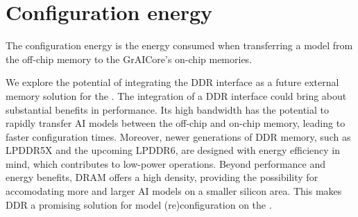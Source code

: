 \section{Configuration energy}
\label{section:configuration_energy}
The configuration energy is the energy consumed when transferring a model from the off-chip memory to the GrAICore's on-chip memories.

We explore the potential of integrating the DDR interface as a future external memory solution for the \graicore{}.
The integration of a DDR interface could bring about substantial benefits in performance.
Its high bandwidth has the potential to rapidly transfer AI models between the off-chip and on-chip memory, leading to faster configuration times.
Moreover, newer generations of DDR memory, such as LPDDR5X and the upcoming LPDDR6, are designed with energy efficiency in mind, which contributes to low-power operations. 
Beyond performance and energy benefits, DRAM offers a high density, providing the possibility for accomodating more and larger AI models on a smaller silicon area.
This makes DDR a promising solution for model (re)configuration on the \graicore{}.



